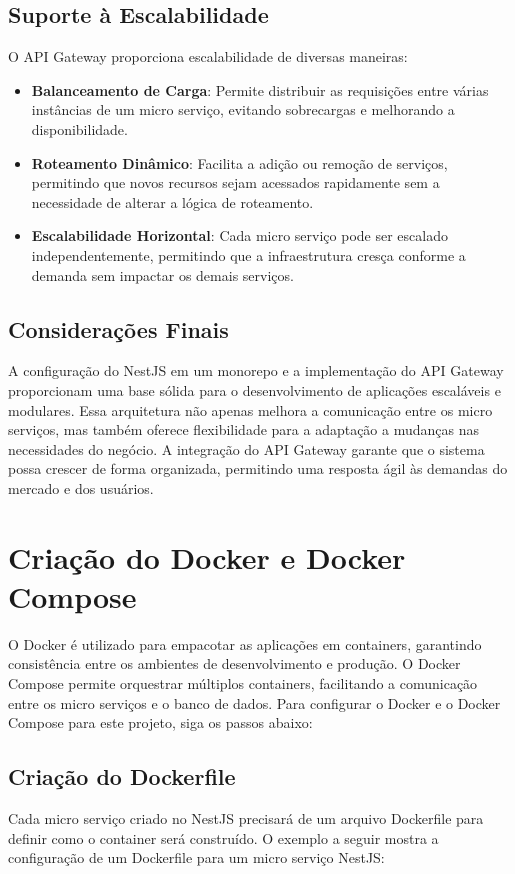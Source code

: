 \subsection{Suporte à Escalabilidade}
O API Gateway proporciona escalabilidade de diversas maneiras:

\begin{itemize}
    \item \textbf{Balanceamento de Carga}: Permite distribuir as requisições entre várias instâncias de um micro serviço, evitando sobrecargas e melhorando a disponibilidade.

    \item \textbf{Roteamento Dinâmico}: Facilita a adição ou remoção de serviços, permitindo que novos recursos sejam acessados rapidamente sem a necessidade de alterar a lógica de roteamento.

    \item \textbf{Escalabilidade Horizontal}: Cada micro serviço pode ser escalado independentemente, permitindo que a infraestrutura cresça conforme a demanda sem impactar os demais serviços.
\end{itemize}

\subsection{Considerações Finais}
A configuração do NestJS em um monorepo e a implementação do API Gateway proporcionam uma base sólida para o desenvolvimento de aplicações escaláveis e modulares. Essa arquitetura não apenas melhora a comunicação entre os micro serviços, mas também oferece flexibilidade para a adaptação a mudanças nas necessidades do negócio. A integração do API Gateway garante que o sistema possa crescer de forma organizada, permitindo uma resposta ágil às demandas do mercado e dos usuários.

\section{Criação do Docker e Docker Compose}

O Docker é utilizado para empacotar as aplicações em containers, garantindo consistência entre os ambientes de desenvolvimento e produção. O Docker Compose permite orquestrar múltiplos containers, facilitando a comunicação entre os micro serviços e o banco de dados. Para configurar o Docker e o Docker Compose para este projeto, siga os passos abaixo:

\subsection{Criação do Dockerfile}
Cada micro serviço criado no NestJS precisará de um arquivo Dockerfile para definir como o container será construído. O exemplo a seguir mostra a configuração de um Dockerfile para um micro serviço NestJS:

